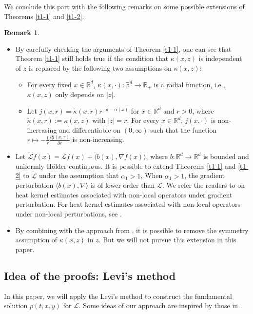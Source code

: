 \documentclass[a4paper,11pt]{amsart}
\newcommand{\R}{\mathds R}
\newcommand{\K}{\kappa}
\newcommand{\A}{\alpha}
\def\LL{{\mathcal L}}
\def\wt{\widetilde}
\theoremstyle{definition}
\newtheorem{remark}[theorem]{Remark}
\begin{document}
We conclude this part with the following remarks on some possible extensions of Theorems \ref{t1-1} and \ref{t1-2}.


\begin{remark}\label{rrr-000}
\begin{itemize}
 \item[(1)] By carefully checking the arguments of Theorem \ref{t1-1}, one can see that Theorem \ref{t1-1} still holds true if the condition that $\K(x,z)$ is independent of $z$ is replaced  by the following two assumptions on $\kappa(x,z)$:
\begin{itemize}
\item [(i)] For every fixed $x \in \R^d$, $\K(x,\cdot):\R^d \rightarrow \R_+$
is a radial function, i.e., $\K(x,z)$ only depends on $|z|$.

\item [(ii)] Let $j(x,r)=\wt \K(x,r)r^{-d-\A(x)}$ for $x \in \R^d$ and $r>0$, where
$\wt \K(x,r):=\K(x,z)$ with $|z|=r$. For every $x \in \R^d$, $j(x,\cdot)$ is non-increasing and differentiable on $(0,\infty)$ such that the function $r\mapsto -\frac{1}{r}\frac{\partial j(x,r)}{\partial r}$ is non-increasing.
\end{itemize}

\item[(2)] Let $\wt \LL f(x)=\LL f(x)+\langle b(x), \nabla f(x)\rangle$, where $b:\R^d\rightarrow \R^d$ is bounded and uniformly
H\"older continuous.
It is possible to extend Theorems \ref{t1-1} and \ref{t1-2}  to $\wt \LL$ under the assumption that $\A_1>1$,
When $\A_1>1$, the gradient perturbation $\langle b(x), \nabla \rangle$ is of lower order than $\LL$.
We  refer the readers to
\cite{BJ, CD, CH, JS, MM, MM1,XZ}
on heat kernel estimates associated
with non-local operators under gradient perturbation.
For heat kernel estimates associated
with non-local operators under non-local perturbations, see \cite{CW, W, CHXZ}.


\item[(3)] By combining with the approach from \cite{CZ4},
it is possible to remove the symmetry assumption of $\kappa (x, z)$ in $z$.
But we will not pursue this extension  in this paper.

\end{itemize}
\end{remark}


\subsection{Idea of the proofs: Levi's method}
In this paper, we will apply the Levi's method to construct
the fundamental solution $p(t,x,y)$ for $\LL$. Some ideas of our approach are inspired by
those in \cite{CZ, Kol}.
\end{document}
